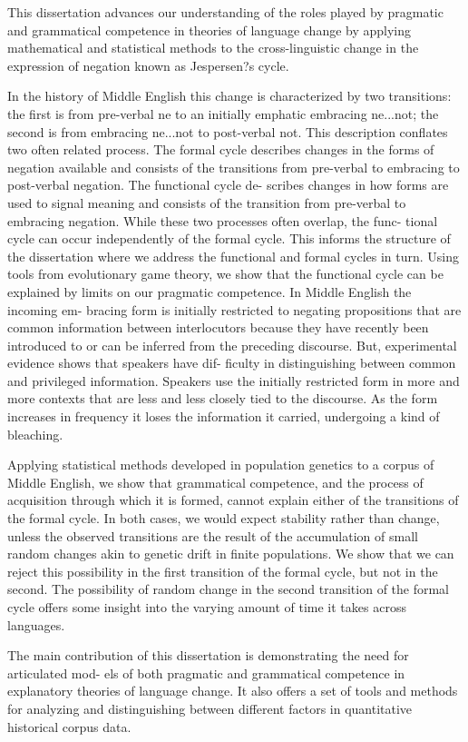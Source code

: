 This dissertation advances our understanding of the roles played by pragmatic and grammatical competence in theories of language change by applying mathematical and statistical methods to the cross-linguistic change in the expression of negation known as Jespersen?s cycle.

In the history of Middle English this change is characterized by two transitions: the first is from pre-verbal ne to an initially emphatic embracing ne...not; the second is from embracing ne...not to post-verbal not. This description conflates two often related process. The formal cycle describes changes in the forms of negation available and consists of the transitions from pre-verbal to embracing to post-verbal negation. The functional cycle de- scribes changes in how forms are used to signal meaning and consists of the transition from pre-verbal to embracing negation. While these two processes often overlap, the func- tional cycle can occur independently of the formal cycle. This informs the structure of the dissertation where we address the functional and formal cycles in turn.
Using tools from evolutionary game theory, we show that the functional cycle can be explained by limits on our pragmatic competence. In Middle English the incoming em- bracing form is initially restricted to negating propositions that are common information between interlocutors because they have recently been introduced to or can be inferred from the preceding discourse. But, experimental evidence shows that speakers have dif- ficulty in distinguishing between common and privileged information. Speakers use the initially restricted form in more and more contexts that are less and less closely tied to the discourse. As the form increases in frequency it loses the information it carried, undergoing a kind of bleaching.

Applying statistical methods developed in population genetics to a corpus of Middle English, we show that grammatical competence, and the process of acquisition through which it is formed, cannot explain either of the transitions of the formal cycle. In both cases, we would expect stability rather than change, unless the observed transitions are the result of the accumulation of small random changes akin to genetic drift in finite populations. We show that we can reject this possibility in the first transition of the formal cycle, but not in the second. The possibility of random change in the second transition of the formal cycle offers some insight into the varying amount of time it takes across languages.

The main contribution of this dissertation is demonstrating the need for articulated mod- els of both pragmatic and grammatical competence in explanatory theories of language change. It also offers a set of tools and methods for analyzing and distinguishing between different factors in quantitative historical corpus data.